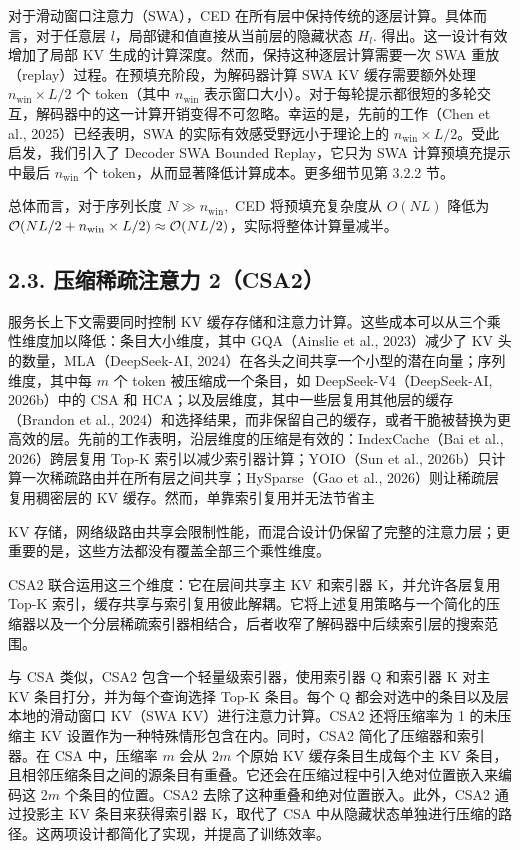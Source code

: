 对于滑动窗口注意力（SWA），CED 在所有层中保持传统的逐层计算。具体而言，对于任意层 $l$，局部键和值直接从当前层的隐藏状态 \(H _ { l } .\) 得出。这一设计有效增加了局部 KV 生成的计算深度。然而，保持这种逐层计算需要一次 SWA 重放（replay）过程。在预填充阶段，为解码器计算 SWA KV 缓存需要额外处理 \(n _ { \mathrm { w i n } } \times L / 2\) 个 token（其中 \(n _ { \mathrm { { w i n } } }\) 表示窗口大小）。对于每轮提示都很短的多轮交互，解码器中的这一计算开销变得不可忽略。幸运的是，先前的工作（Chen et al., 2025）已经表明，SWA 的实际有效感受野远小于理论上的 \(n _ { \mathrm { w i n } } \times L / 2\)。受此启发，我们引入了 Decoder SWA Bounded Replay，它只为 SWA 计算预填充提示中最后 \(n _ { \mathrm { w i n } }\) 个 token，从而显著降低计算成本。更多细节见第 3.2.2 节。

总体而言，对于序列长度 \(N \gg n _ { \mathrm { w i n } } ,\) CED 将预填充复杂度从 \(O ( N L )\) 降低为 \({ \cal O } ( N L / 2 + n _ { \mathrm { w i n } } \times L / 2 ) \approx { \cal O } ( N L / 2 )\)，实际将整体计算量减半。

\subsection{2.3. 压缩稀疏注意力 2（CSA2）}\label{compressed-sparse-attention-2-csa2}

服务长上下文需要同时控制 KV 缓存存储和注意力计算。这些成本可以从三个乘性维度加以降低：条目大小维度，其中 GQA（Ainslie et al., 2023）减少了 KV 头的数量，MLA（DeepSeek-AI, 2024）在各头之间共享一个小型的潜在向量；序列维度，其中每 $m$ 个 token 被压缩成一个条目，如 DeepSeek-V4（DeepSeek-AI, 2026b）中的 CSA 和 HCA；以及层维度，其中一些层复用其他层的缓存（Brandon et al., 2024）和选择结果，而非保留自己的缓存，或者干脆被替换为更高效的层。先前的工作表明，沿层维度的压缩是有效的：IndexCache（Bai et al., 2026）跨层复用 Top-K 索引以减少索引器计算；YOIO（Sun et al., 2026b）只计算一次稀疏路由并在所有层之间共享；HySparse（Gao et al., 2026）则让稀疏层复用稠密层的 KV 缓存。然而，单靠索引复用并无法节省主






KV 存储，网络级路由共享会限制性能，而混合设计仍保留了完整的注意力层；更重要的是，这些方法都没有覆盖全部三个乘性维度。

CSA2 联合运用这三个维度：它在层间共享主 KV 和索引器 K，并允许各层复用 Top-K 索引，缓存共享与索引复用彼此解耦。它将上述复用策略与一个简化的压缩器以及一个分层稀疏索引器相结合，后者收窄了解码器中后续索引层的搜索范围。

与 CSA 类似，CSA2 包含一个轻量级索引器，使用索引器 Q 和索引器 K 对主 KV 条目打分，并为每个查询选择 Top-K 条目。每个 Q 都会对选中的条目以及层本地的滑动窗口 KV（SWA KV）进行注意力计算。CSA2 还将压缩率为 1 的未压缩主 KV 设置作为一种特殊情形包含在内。同时，CSA2 简化了压缩器和索引器。在 CSA 中，压缩率 $m$ 会从 $2m$ 个原始 KV 缓存条目生成每个主 KV 条目，且相邻压缩条目之间的源条目有重叠。它还会在压缩过程中引入绝对位置嵌入来编码这 $2m$ 个条目的位置。CSA2 去除了这种重叠和绝对位置嵌入。此外，CSA2 通过投影主 KV 条目来获得索引器 K，取代了 CSA 中从隐藏状态单独进行压缩的路径。这两项设计都简化了实现，并提高了训练效率。

